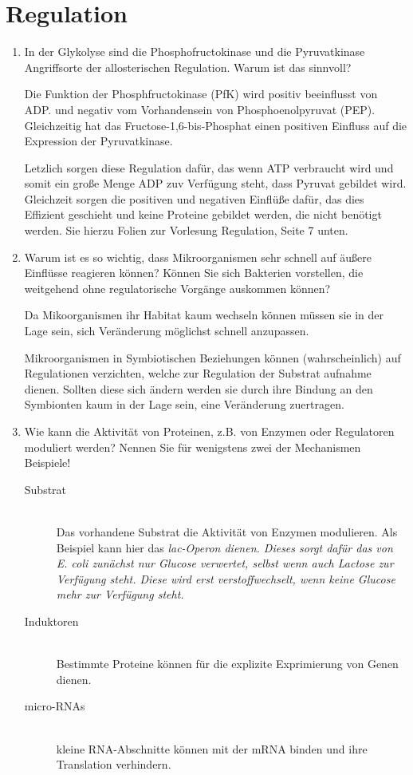 
\section{Regulation}
\begin{enumerate}
	\item In der Glykolyse sind die Phosphofructokinase und die Pyruvatkinase Angriffsorte der allosterischen Regulation. Warum ist das sinnvoll?

		Die Funktion der Phosphfructokinase (PfK) wird positiv beeinflusst von ADP.
		und negativ vom Vorhandensein von Phosphoenolpyruvat (PEP).	
		Gleichzeitig hat das Fructose-1,6-bis-Phosphat einen positiven Einfluss auf die Expression
		der Pyruvatkinase.

		Letzlich sorgen diese Regulation dafür,
		das wenn ATP verbraucht wird und somit ein große Menge ADP zuv Verfügung steht,
		dass Pyruvat gebildet wird.
		Gleichzeit sorgen die positiven und negativen Einflüße dafür,
		das dies Effizient geschieht und keine Proteine gebildet werden,
		die nicht benötigt werden.
		Sie hierzu Folien zur Vorlesung Regulation, Seite 7 unten. 

	\item Warum ist es so wichtig, dass Mikroorganismen sehr schnell auf äußere Einflüsse reagieren können? Können Sie sich Bakterien vorstellen, die weitgehend ohne regulatorische Vorgänge auskommen können?

		Da Mikoorganismen ihr Habitat kaum wechseln können müssen sie in der Lage sein,
		sich Veränderung möglichst schnell anzupassen.

		Mikroorganismen in Symbiotischen Beziehungen können (wahrscheinlich) auf Regulationen verzichten,
		welche zur Regulation der Substrat aufnahme dienen.
		Sollten diese sich ändern werden sie durch ihre Bindung an den Symbionten kaum in der Lage sein,
		eine Veränderung zuertragen.

	\item Wie kann die Aktivität von Proteinen, z.B. von Enzymen oder Regulatoren moduliert werden? Nennen Sie für wenigstens zwei der Mechanismen Beispiele!

		\begin{description}
			\item[Substrat] \hfill \\
				Das vorhandene Substrat die Aktivität von Enzymen modulieren.
				Als Beispiel kann hier das \slshape{lac}-Operon dienen.
				Dieses sorgt dafür das von \emph{E. coli} zunächst nur Glucose verwertet,
				selbst wenn auch Lactose zur Verfügung steht.
				Diese wird erst verstoffwechselt,
				wenn keine Glucose mehr zur Verfügung steht.
			\item[Induktoren] \hfill \\
				Bestimmte Proteine können für die explizite Exprimierung von Genen dienen. %
			\item[micro-RNAs] \hfill \\
				kleine RNA-Abschnitte können mit der mRNA binden und ihre Translation verhindern.
		\end{description}


\end{enumerate}
